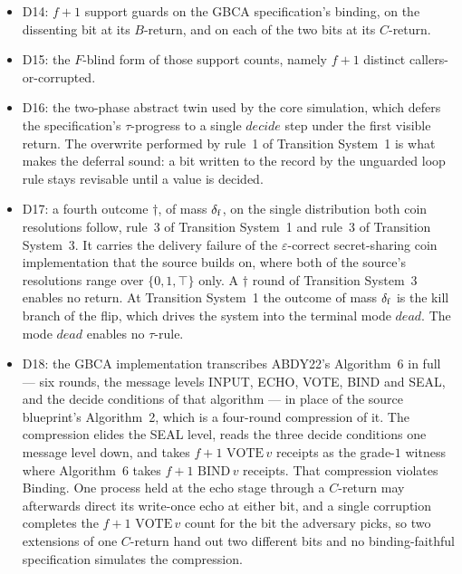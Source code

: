 \begin{itemize}
    $\mathrm{callABA}$ input-enabled, records first-write-wins.
    Neither write is a claim about who called honestly.
    The support guard on rule~4 is what turns the record into provenance.
  \item D14: $f+1$ support guards on the GBCA specification's binding, on the
    dissenting bit at its $B$-return, and on each of the two bits at its
    $C$-return.
  \item D15: the $F$-blind form of those support counts, namely $f+1$ distinct
    callers-or-corrupted.
  \item D16: the two-phase abstract twin used by the core simulation, which
    defers the specification's $\tau$-progress to a single $decide$ step under
    the first visible return.
    The overwrite performed by rule~1 of Transition System~1 is what makes the
    deferral sound: a bit written to the record by the unguarded loop rule
    stays revisable until a value is decided.
  \item D17: a fourth outcome $\dagger$, of mass $\delta_{\mathrm{f}}$, on the single
    distribution both coin resolutions follow, rule~3 of Transition System~1 and
    rule~3 of Transition System~3.
    It carries the delivery failure of the $\varepsilon$-correct secret-sharing
    coin implementation that the source builds on, where both of the source's
    resolutions range over $\{0,1,\top\}$ only.
    A $\dagger$ round of Transition System~3 enables no return.
    At Transition System~1 the outcome of mass $\delta_{\mathrm{f}}$ is the kill branch of
    the flip, which drives the system into the terminal mode $dead$.
    The mode $dead$ enables no $\tau$-rule.
  \item D18: the GBCA implementation transcribes ABDY22's Algorithm~6 in full
    --- six rounds, the message levels INPUT, ECHO, VOTE, BIND and SEAL, and
    the decide conditions of that algorithm --- in place of the source
    blueprint's Algorithm~2, which is a four-round compression of it.
    The compression elides the SEAL level, reads the three decide conditions
    one message level down, and takes $f{+}1$ $\mathrm{VOTE}\,v$ receipts as
    the grade-$1$ witness where Algorithm~6 takes $f{+}1$ $\mathrm{BIND}\,v$
    receipts.
    That compression violates Binding.
    One process held at the echo stage through a $C$-return may afterwards
    direct its write-once echo at either bit, and a single corruption completes
    the $f{+}1$ $\mathrm{VOTE}\,v$ count for the bit the adversary picks, so two
    extensions of one $C$-return hand out two different bits and no
    binding-faithful specification simulates the compression.

\end{itemize}
